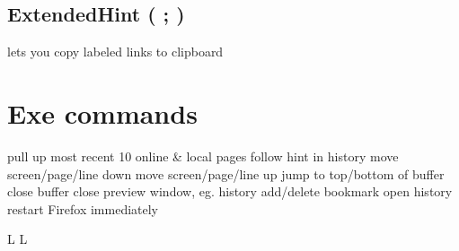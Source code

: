 \subsection{ExtendedHint ( ; )}{lets you copy labeled links to clipboard}

\section{Exe commands}{}
	{pull up most recent 10 online \& local pages}
	{follow hint in history}
	{move screen/page/line down}
	{move screen/page/line up}
	{jump to top/bottom of buffer}
	{close buffer}
	{close preview window, eg. history}
	{add/delete bookmark}
	{open history}
	{restart Firefox immediately}

\copyrightnotice

\vfil
\supereject
\if L\lr \else\null\vfill\eject\fi
\if L\lr \else\null\vfill\eject\fi
\bye

